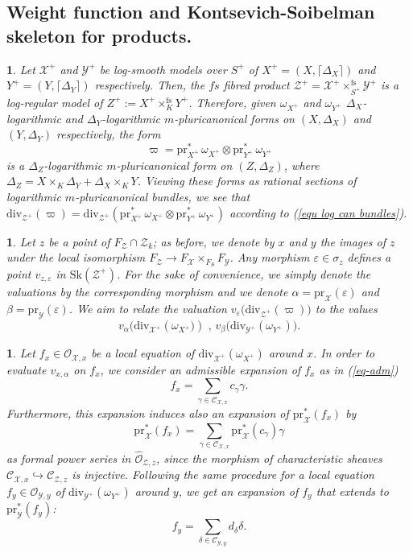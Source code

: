 \documentclass{amsart}%
\numberwithin{equation}{subsection}
\theoremstyle{plain2}
\theoremstyle{definition2}
\theoremstyle{stepstyle}
\theoremstyle{point}
\theoremstyle{subpoint}
\newtheorem{subpoint}[equation]{}%
\newcommand{\spa}[1]{\begin{subpoint}#1\end{subpoint}}           %
\newcommand{\cX}{\ensuremath{\mathscr{X}}}
\newcommand{\caC}{\ensuremath{\mathcal{C}}}
\newcommand{\caO}{\ensuremath{\mathcal{O}}}
\newcommand{\cY}{\ensuremath{\mathscr{Y}}}
\newcommand{\cZ}{\ensuremath{\mathscr{Z}}}
\renewcommand{\cY}{\ensuremath{\mathscr{Y}}}
\newcommand{\pr}{\mathrm{pr}}
\newcommand{\divisor}{\mathrm{div}}
\newcommand{\Sk}{\mathrm{Sk}}
\begin{document}
\subsection{Weight function and Kontsevich-Soibelman skeleton for products.} \label{paragraph weight function product}
\spa{Let $\cX^+$ and $\cY^+$ be log-smooth models over $S^+$ of $X^+=(X,\lceil\Delta_X\rceil)$ and $Y^+=(Y,\lceil\Delta_Y\rceil)$ respectively. Then, the $fs$ fibred product $\cZ^+=\cX^+  \times^{\text{fs}}_{S^+} \cY^+$ is a log-regular model of $Z^+:=X^+ \times^{\text{fs}}_K Y^+$. Therefore, given $\omega_{X^+}$ and $\omega_{Y^+}$ $\Delta_X$-logarithmic and $\Delta_Y$-logarithmic $m$-pluricanonical forms on $(X,\Delta_X)$ and $(Y,\Delta_Y)$ respectively, the form $$\varpi=\pr_{X^+}^* \,\omega_{X^+} \otimes \pr_{Y^+}^* \,\omega_{Y^+}$$ is a $\Delta_Z$-logarithmic $m$-pluricanonical form on $(Z,\Delta_Z)$, where $\Delta_Z= X \times_K \Delta_Y + \Delta_X \times_K Y$. Viewing these forms as rational sections of logarithmic $m$-pluricanonical bundles, we see that $\divisor_{\cZ^+}(\varpi)=\divisor_{\cZ^+}( \pr_{X^+}^* \,\omega_{X^+} \otimes \pr_{Y^+}^* \,\omega_{Y^+})$ according to (\ref{equ log can bundles}).}

\spa{Let $z$ be a point of $F_{\cZ} \cap \cZ_k$; as before, we denote by $x$ and $y$ the images of $z$ under the local isomorphism $F_{\cZ} \rightarrow F_{\cX} \times_{F_S} F_{\cY}$. Any morphism $\varepsilon \in \sigma_z$ defines a point $v_{z,\varepsilon}$ in $\Sk(\cZ^+)$. For the sake of convenience, we simply denote the valuations by the corresponding morphism and we denote $\alpha= \pr_{\cX}(\varepsilon)$ and $\beta=\pr_{\cY}(\varepsilon)$. We aim to relate the valuation $v_{\varepsilon}\big(\divisor_{\cZ^+}(\varpi)\big)$ to the values $$v_{\alpha}\big(\divisor_{\cX^+}(\omega_{X^+}\big)) \text{ , } v_{\beta}\big(\divisor_{\cY^+}(\omega_{Y^+})\big).$$}

\spa{Let $f_x \in \caO_{\cX,x}$ be a local equation of $\divisor_{\cX^+}(\omega_{X^+})$ around $x$. In order to evaluate $v_{x,\alpha}$ on $f_x$, we consider an admissible expansion of $f_x$ as in (\ref{eq-adm}) $$f_x=\sum_{\gamma\in \caC_{\cX,x}}c_\gamma \gamma.$$ Furthermore, this expansion induces also an expansion of $\pr_{\cX}^*(f_x)$ by  $$\pr_{\cX}^*(f_x)=\sum_{\gamma\in \caC_{\cX,x} }\pr^*_{\cX}(c_\gamma) \gamma$$ as formal power series in $\widehat{\caO}_{\cZ,z}$, since the morphism of characteristic sheaves $\mathcal{C}_{\cX,x} \hookrightarrow \mathcal{C}_{\cZ,z}$ is injective. Following the same procedure for a local equation $f_y \in \caO_{\cY,y}$ of $\divisor_{\cY^+}(\omega_{Y^+})$ around $y$, we get an expansion of $f_y$ that extends to $\pr_{\cY}^*(f_y)$: 
$$f_y=\sum_{\delta\in \caC_{\cY,y}}d_\delta \delta.$$}
\end{document}
